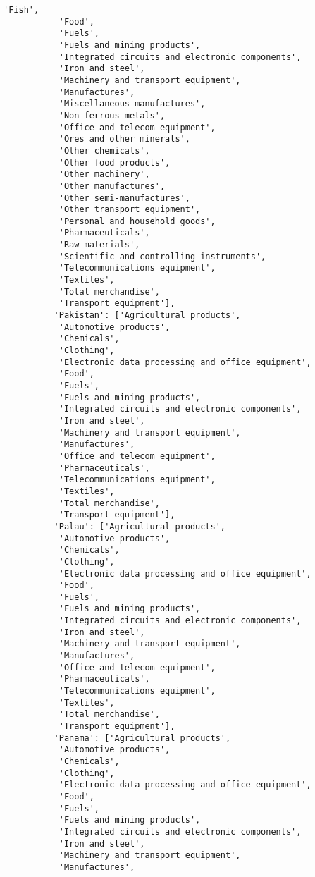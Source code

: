 \documentclass[11pt]{article}
\begin{document}
\begin{Verbatim}[commandchars=\\\{\}]
           'Fish',
           'Food',
           'Fuels',
           'Fuels and mining products',
           'Integrated circuits and electronic components',
           'Iron and steel',
           'Machinery and transport equipment',
           'Manufactures',
           'Miscellaneous manufactures',
           'Non-ferrous metals',
           'Office and telecom equipment',
           'Ores and other minerals',
           'Other chemicals',
           'Other food products',
           'Other machinery',
           'Other manufactures',
           'Other semi-manufactures',
           'Other transport equipment',
           'Personal and household goods',
           'Pharmaceuticals',
           'Raw materials',
           'Scientific and controlling instruments',
           'Telecommunications equipment',
           'Textiles',
           'Total merchandise',
           'Transport equipment'],
          'Pakistan': ['Agricultural products',
           'Automotive products',
           'Chemicals',
           'Clothing',
           'Electronic data processing and office equipment',
           'Food',
           'Fuels',
           'Fuels and mining products',
           'Integrated circuits and electronic components',
           'Iron and steel',
           'Machinery and transport equipment',
           'Manufactures',
           'Office and telecom equipment',
           'Pharmaceuticals',
           'Telecommunications equipment',
           'Textiles',
           'Total merchandise',
           'Transport equipment'],
          'Palau': ['Agricultural products',
           'Automotive products',
           'Chemicals',
           'Clothing',
           'Electronic data processing and office equipment',
           'Food',
           'Fuels',
           'Fuels and mining products',
           'Integrated circuits and electronic components',
           'Iron and steel',
           'Machinery and transport equipment',
           'Manufactures',
           'Office and telecom equipment',
           'Pharmaceuticals',
           'Telecommunications equipment',
           'Textiles',
           'Total merchandise',
           'Transport equipment'],
          'Panama': ['Agricultural products',
           'Automotive products',
           'Chemicals',
           'Clothing',
           'Electronic data processing and office equipment',
           'Food',
           'Fuels',
           'Fuels and mining products',
           'Integrated circuits and electronic components',
           'Iron and steel',
           'Machinery and transport equipment',
           'Manufactures',

\end{Verbatim}
\end{document}
